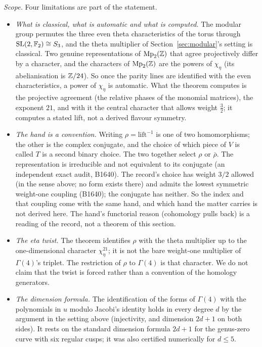 \noindent\emph{Scope.} Four limitations are part of the statement.
\begin{itemize}
\item \emph{What is classical, what is automatic and what is computed.} The modular group permutes the three even theta
  characteristics of the torus through $\mathrm{SL}(2,\mathbb F_2)\cong S_3$, and the theta multiplier of Section~\ref{sec:modular}'s
  setting is classical. Two genuine representations of $\mathrm{Mp}_2(\mathbb{Z})$ that agree projectively differ by a character,
  and the characters of $\mathrm{Mp}_2(\mathbb{Z})$ are the powers of $\chi_\eta$ (its abelianisation is $\mathbb{Z}/24$). So once the
  parity lines are identified with the even characteristics, a power of $\chi_\eta$ is automatic. What the theorem
  computes is the projective agreement (the relative phases of the monomial matrices), the exponent $21$, and with it the
  central character that allows weight $\tfrac32$; it computes a stated lift, not a derived flavour symmetry.
\item \emph{The hand is a convention.} Writing $\rho=\mathrm{lift}^{-1}$ is one of two homomorphisms; the other is the
  complex conjugate, and the choice of which piece of $V$ is called $T$ is a second binary choice. The two together
  select $\rho$ or $\bar\rho$. The representation is irreducible and not equivalent to its conjugate (an independent exact
  audit, B1640). The record's choice has weight $3/2$ allowed (in the sense above; no form exists there) and admits the lowest
  symmetric weight-one coupling (B1640); the conjugate has neither. So the index and that coupling come with the same hand,
  and which hand the matter carries is not derived here. The hand's functorial reason (cohomology pulls back) is a
  reading of the record, not a theorem of this section.
\item \emph{The eta twist.} The theorem identifies $\rho$ with the theta multiplier up to the one-dimensional character
  $\chi_\eta^{21}$; it is not the bare weight-one multiplier of $\Gamma(4)$'s triplet. The restriction of $\rho$ to $\Gamma(4)$ is that
  character. We do not claim that the twist is forced rather than a convention of the homology generators.
\item \emph{The dimension formula.} The identification of the forms of $\Gamma(4)$ with the polynomials in $u$ modulo
  Jacobi's identity holds in every degree $d$ by the argument in the setting above (injectivity, and dimension $2d+1$ on both
  sides). It rests on the standard dimension formula $2d+1$ for the genus-zero curve with six regular cusps; it was also
  certified numerically for $d\le5$.
\end{itemize}

